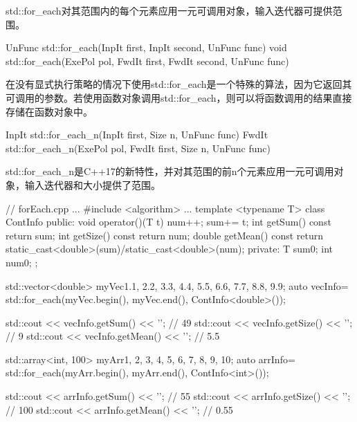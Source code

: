 std::for\_each对其范围内的每个元素应用一元可调用对象，输入迭代器可提供范围。

\begin{cpp}
UnFunc std::for_each(InpIt first, InpIt second, UnFunc func)
void std::for_each(ExePol pol, FwdIt first, FwdIt second, UnFunc func)
\end{cpp}

在没有显式执行策略的情况下使用std::for\_each是一个特殊的算法，因为它返回其可调用的参数。若使用函数对象调用std::for\_each，则可以将函数调用的结果直接存储在函数对象中。

\begin{cpp}
InpIt std::for_each_n(InpIt first, Size n, UnFunc func) FwdIt std::for_each_n(ExePol pol, FwdIt first, Size n, UnFunc func)
\end{cpp}

std::for\_each\_n是C++17的新特性，并对其范围的前n个元素应用一元可调用对象，输入迭代器和大小提供了范围。


\begin{cpp}
// forEach.cpp
...
#include <algorithm>
...
template <typename T>
class ContInfo{
public:
	void operator()(T t){
		num++;
		sum+= t;
	}
	int getSum() const{ return sum; }
	int getSize() const{ return num; }
	double getMean() const{
		return static_cast<double>(sum)/static_cast<double>(num);
	}
private:
	T sum{0};
	int num{0};
};

std::vector<double> myVec{1.1, 2.2, 3.3, 4.4, 5.5, 6.6, 7.7, 8.8, 9.9};
auto vecInfo= std::for_each(myVec.begin(), myVec.end(), ContInfo<double>());

std::cout << vecInfo.getSum() << '\n'; // 49
std::cout << vecInfo.getSize() << '\n'; // 9
std::cout << vecInfo.getMean() << '\n'; // 5.5

std::array<int, 100> myArr{1, 2, 3, 4, 5, 6, 7, 8, 9, 10};
auto arrInfo= std::for_each(myArr.begin(), myArr.end(), ContInfo<int>());

std::cout << arrInfo.getSum() << '\n'; // 55
std::cout << arrInfo.getSize() << '\n'; // 100
std::cout << arrInfo.getMean() << '\n'; // 0.55
\end{cpp}

























